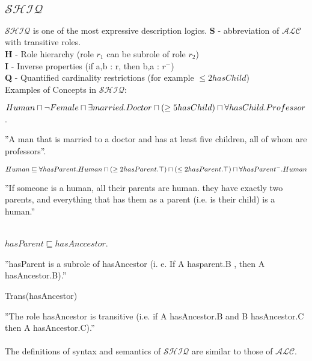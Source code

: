 \subsection{$\mathcal{SHIQ}$} 
\label{SHIQ}
$\mathcal{SHIQ}$ is one of the most expressive description logics.
\textbf{S} - abbreviation of \textbf{$\mathcal{ALC}$} with transitive roles. \\
\textbf{H} - Role hierarchy  (role $r_1$ can be subrole of role $r_2$)\\
\textbf{I} - Inverse properties   (if a,b : r, then b,a : $r^-$) \\
\textbf{Q} - Quantified cardinality restrictions  (for example $\leq 2  hasChild$)\\

Examples of Concepts in \textbf{$\mathcal{SHIQ}$}:
\begin{myex} \cite{handbook}
$ Human  \sqcap \neg Female \sqcap \exists married.Doctor \\
 \sqcap (\geq 5  hasChild) \sqcap \forall hasChild.Professor $ .
\end{myex}
''A man that is married to a doctor and has at least five
children, all of whom are professors''.
\begin{myex} \cite{handbook}
$Human \sqsubseteq \forall hasParent.Human \sqcap (\geq 2 hasParent.\top) \\
 \sqcap (\leq 2 hasParent.\top) 
\sqcap \forall hasParent^-.Human$
\end{myex}
''If someone is a human, all their parents are human. they have exactly two parents, and everything that has them as a parent (i.e. is their child) is a human.''
\begin{myex}
\label{rolehierarchy}
 \cite{handbook}\\
$hasParent \sqsubseteq hasAnccestor$.
\end{myex}
''hasParent is a subrole of hasAncestor (i. e. If A hasparent.B , then A hasAncestor.B).''
\begin{myex}
Trans(hasAncestor) 
\end{myex}
''The role hasAncestor is transitive (i.e. if A hasAncestor.B and B hasAncestor.C then A hasAncestor.C).'' \\
\\
The definitions of syntax and semantics of $\mathcal{SHIQ}$ are similar to those of $\mathcal{ALC}$.
